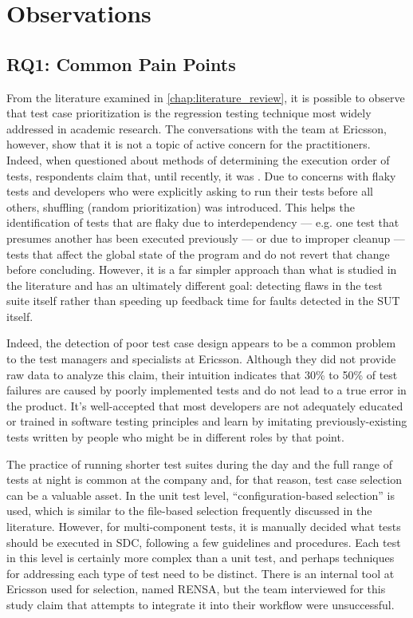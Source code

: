 \section{Observations}\label{sec:ind_challenges}

\subsection{RQ1: Common Pain Points}
\label{sec:ind_rq1}

From the literature examined in \autoref{chap:literature_review}, it is possible to observe that test case prioritization is the regression testing technique most widely addressed in academic research.
The conversations with the team at Ericsson, however, show that it is not a topic of active concern for the practitioners.
Indeed, when questioned about methods of determining the execution order of tests, respondents claim that, until recently, it was .
Due to concerns with flaky tests and developers who were explicitly asking to run their tests before all others, shuffling (random prioritization) was introduced.
This helps the identification of tests that are flaky due to interdependency — e.g. one test that presumes another has been executed previously — or due to improper cleanup — tests that affect the global state of the program and do not revert that change before concluding.
However, it is a far simpler approach than what is studied in the literature and has an ultimately different goal: detecting flaws in the test suite itself rather than speeding up feedback time for faults detected in the SUT itself.

Indeed, the detection of poor test case design appears to be a common problem to the test managers and specialists at Ericsson.
Although they did not provide raw data to analyze this claim, their intuition indicates that 30\% to 50\% of test failures are caused by poorly implemented tests and do not lead to a true error in the product.
It's well-accepted that most developers are not adequately educated or trained in software testing principles and learn by imitating previously-existing tests written by people who might be in different roles by that point.

The practice of running shorter test suites during the day and the full range of tests at night is common at the company and, for that reason, test case selection can be a valuable asset.
In the unit test level, ``configuration-based selection'' is used, which is similar to the file-based selection frequently discussed in the literature.
However, for multi-component tests, it is manually decided what tests should be executed in SDC, following a few guidelines and procedures.
Each test in this level is certainly more complex than a unit test, and perhaps techniques for addressing each type of test need to be distinct.
There is an internal tool at Ericsson used for selection, named RENSA, but the team interviewed for this study claim that attempts to integrate it into their workflow were unsuccessful.

